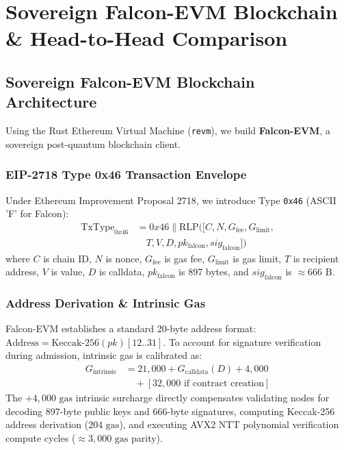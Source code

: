 \documentclass[a4paper,fleqn]{cas-dc}
\begin{document}
\section{Sovereign Falcon-EVM Blockchain \& Head-to-Head Comparison}
\label{sec:evm_comparison}

\subsection{Sovereign Falcon-EVM Blockchain Architecture}
Using the Rust Ethereum Virtual Machine (\texttt{revm}), we build \textbf{Falcon-EVM}, a sovereign post-quantum blockchain client. 

\subsubsection{EIP-2718 Type 0x46 Transaction Envelope}
Under Ethereum Improvement Proposal 2718, we introduce Type \texttt{0x46} (ASCII 'F' for Falcon):
\begin{align}
    \text{TxType}_{0x46} &= 0x46 \parallel \text{RLP}([C, N, G_{\text{fee}}, G_{\text{limit}}, \nonumber \\
    &\quad T, V, D, pk_{\text{falcon}}, sig_{\text{falcon}}])
    \label{eq:type46}
\end{align}
where $C$ is chain ID, $N$ is nonce, $G_{\text{fee}}$ is gas fee, $G_{\text{limit}}$ is gas limit, $T$ is recipient address, $V$ is value, $D$ is calldata, $pk_{\text{falcon}}$ is 897 bytes, and $sig_{\text{falcon}}$ is $\approx 666\text{ B}$.

\subsubsection{Address Derivation \& Intrinsic Gas}
Falcon-EVM establishes a standard 20-byte address format: $\text{Address} = \text{Keccak-256}(pk)[12..31]$. To account for signature verification during admission, intrinsic gas is calibrated as:
\begin{align}
    G_{\text{intrinsic}} &= 21,000 + G_{\text{calldata}}(D) + 4,000 \nonumber \\
    &\quad + [32,000 \text{ if contract creation}]
    \label{eq:intrinsic_gas}
\end{align}
The $+4,000\text{ gas}$ intrinsic surcharge directly compensates validating nodes for decoding 897-byte public keys and 666-byte signatures, computing Keccak-256 address derivation ($204\text{ gas}$), and executing AVX2 NTT polynomial verification compute cycles ($\approx 3,000\text{ gas}$ parity).
\end{document}
